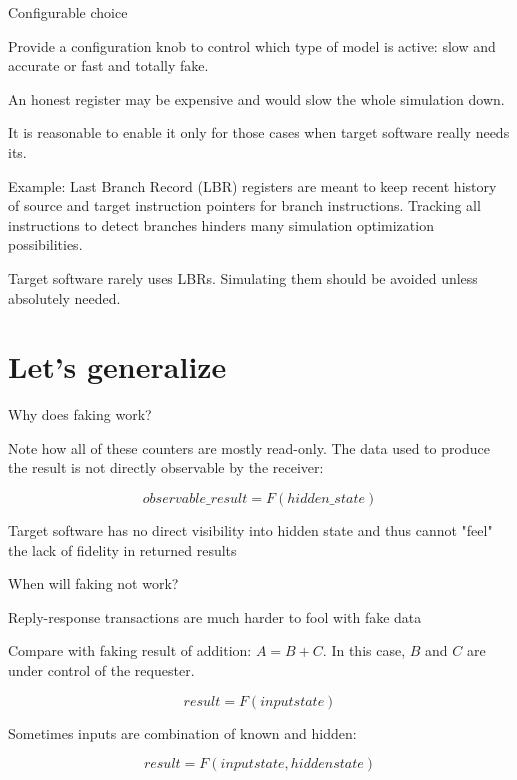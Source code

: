 \begin{frame}{Configurable choice}

Provide a configuration knob to control which type of model is active: slow and accurate or
fast and totally fake.

An honest register may be expensive and would slow the whole simulation down.

It is reasonable to enable it only for those cases when target software really needs its. 

Example: Last Branch Record (LBR) registers are meant to keep
recent history of source and target instruction pointers for branch
instructions. Tracking all instructions to detect branches hinders many simulation optimization possibilities.

Target software rarely uses LBRs. Simulating them should be avoided unless absolutely needed.
  
\end{frame}

\section{Let's generalize}

\begin{frame}{Why does faking work?}

Note how all of these counters are mostly read-only. The data used to produce the result is not directly observable by the receiver:

$$observable\_result = F(hidden\_state)$$

Target software has no direct visibility into hidden state and thus cannot "feel" the lack of fidelity in returned results

\end{frame}

\begin{frame}{When will faking not work?}

Reply-response transactions are much harder to fool with fake data

Compare with faking result of addition: $A = B + C$. In this case, $B$ and $C$ are under control of the requester.

$$result = F(input state)$$

Sometimes inputs are combination of known and hidden:

$$result = F(input state, hidden state)$$


\end{frame}


